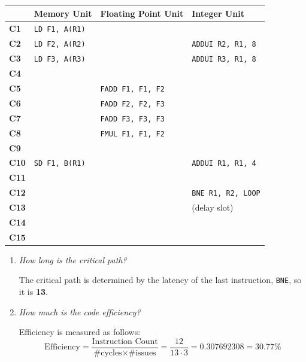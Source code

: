 \begin{table}[!htp]
    \centering
    \begin{tabular}{@{} l | l | l | l @{}}
        \toprule
        & \textbf{Memory Unit} & \textbf{Floating Point Unit} & \textbf{Integer Unit} \\
        \midrule
        \textbf{C1}  & \texttt{LD F1, A(R1)} & & \\ [.3em]
        \textbf{C2}  & \texttt{LD F2, A(R2)} & & \texttt{ADDUI R2, R1, 8} \\ [.3em]
        \textbf{C3}  & \texttt{LD F3, A(R3)} & & \texttt{ADDUI R3, R1, 8} \\ [.3em]
        \textbf{C4}  & & & \\ [.3em]
        \textbf{C5}  & & \texttt{FADD F1, F1, F2} & \\ [.3em]
        \textbf{C6}  & & \texttt{FADD F2, F2, F3} & \\ [.3em]
        \textbf{C7}  & & \texttt{FADD F3, F3, F3} & \\ [.3em]
        \textbf{C8}  & & \texttt{FMUL F1, F1, F2} & \\ [.3em]
        \textbf{C9}  & & & \\ [.3em]
        \textbf{C10}  & \texttt{SD F1, B(R1)} & & \texttt{ADDUI R1, R1, 4} \\ [.3em]
        \textbf{C11}  & & & \\ [.3em]
        \textbf{C12}  & & & \texttt{BNE R1, R2, LOOP} \\ [.3em]
        \textbf{C13}  & & & (delay slot) \\ [.3em]
        \textbf{C14}  & & & \\ [.3em]
        \textbf{C15}  & & & \\
        \bottomrule
    \end{tabular}
\end{table}

\begin{enumerate}
    \item \emph{How long is the critical path?}

    \answer The critical path is determined by the latency of the last instruction, \texttt{BNE}, so it is \textbf{13}.


    \item \emph{How much is the code efficiency?}

    \answer Efficiency is measured as follows:
    \begin{equation*}
        \text{Efficiency} = \dfrac{\text{Instruction Count}}{\text{\# cycles} \times \text{\# issues}} = \dfrac{12}{13 \cdot 3} = 0.307692308 = 30.77 \%
    \end{equation*}
\end{enumerate}

